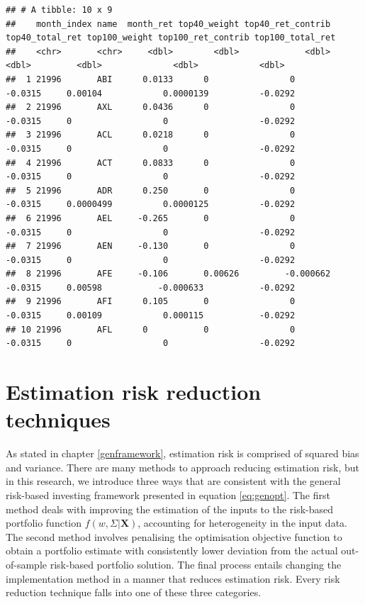 \documentclass[
]{article}
\begin{document}
\begin{verbatim}
## # A tibble: 10 x 9
##    month_index name  month_ret top40_weight top40_ret_contrib top40_total_ret top100_weight top100_ret_contrib top100_total_ret
##    <chr>       <chr>     <dbl>        <dbl>             <dbl>           <dbl>         <dbl>              <dbl>            <dbl>
##  1 21996       ABI      0.0133      0                0                -0.0315     0.00104            0.0000139          -0.0292
##  2 21996       AXL      0.0436      0                0                -0.0315     0                  0                  -0.0292
##  3 21996       ACL      0.0218      0                0                -0.0315     0                  0                  -0.0292
##  4 21996       ACT      0.0833      0                0                -0.0315     0                  0                  -0.0292
##  5 21996       ADR      0.250       0                0                -0.0315     0.0000499          0.0000125          -0.0292
##  6 21996       AEL     -0.265       0                0                -0.0315     0                  0                  -0.0292
##  7 21996       AEN     -0.130       0                0                -0.0315     0                  0                  -0.0292
##  8 21996       AFE     -0.106       0.00626         -0.000662         -0.0315     0.00598           -0.000633           -0.0292
##  9 21996       AFI      0.105       0                0                -0.0315     0.00109            0.000115           -0.0292
## 10 21996       AFL      0           0                0                -0.0315     0                  0                  -0.0292
\end{verbatim}

\hypertarget{estriskreduce}{%
\section{Estimation risk reduction techniques}\label{estriskreduce}}

As stated in chapter \ref{genframework}, estimation risk is comprised of squared bias and variance.
There are many methods to approach reducing estimation risk, but in this research, we introduce three
ways that are consistent with the general risk-based investing framework presented in equation
\eqref{eq:genopt}. The first method deals with improving the estimation of the inputs to the risk-based
portfolio function \(f(w, \Sigma|\textbf{X})\), accounting for heterogeneity in the input data. The
second method involves penalising the optimisation objective function to obtain a portfolio estimate
with consistently lower deviation from the actual out-of-sample risk-based portfolio solution. The
final process entails changing the implementation method in a manner that reduces estimation risk.
Every risk reduction technique falls into one of these three categories.
\end{document}
